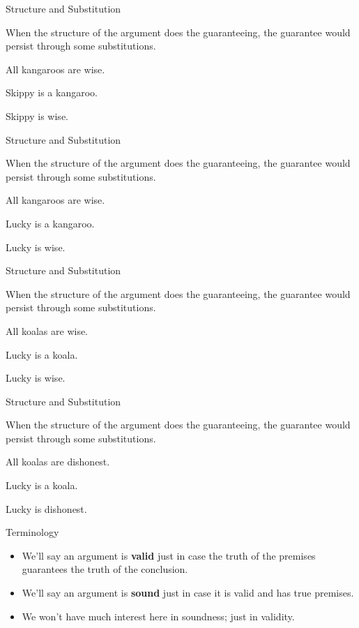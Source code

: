 \documentclass[ignorenonframetext,]{beamer}
\providecommand{\tightlist}{%
  \setlength{\itemsep}{0pt}\setlength{\parskip}{0pt}}
\renewcommand{\,}{\text{, }}
\renewenvironment*{quote}	
	{\list{}{\rightmargin   \leftmargin} \item } 	
	{\endlist }
\newcommand{\DisplayArg}[2]{
\begin{enumerate}
{#1}
\end{enumerate}
\vspace{-6pt}
\hrulefill

\begin{quote}
{\normalfont #2}
\end{quote}
\vspace{12pt}
}
\begin{document}
\begin{frame}{Structure and Substitution}
\protect\hypertarget{structure-and-substitution}{}

When the structure of the argument does the guaranteeing, the guarantee
would persist through some substitutions.

\DisplayArg{ \item All kangaroos are wise. \item Skippy is a kangaroo. } { Skippy is wise. }

\end{frame}

\begin{frame}{Structure and Substitution}
\protect\hypertarget{structure-and-substitution-1}{}

When the structure of the argument does the guaranteeing, the guarantee
would persist through some substitutions.

\DisplayArg{ \item All kangaroos are wise. \item Lucky is a kangaroo. } { Lucky is wise. }

\end{frame}

\begin{frame}{Structure and Substitution}
\protect\hypertarget{structure-and-substitution-2}{}

When the structure of the argument does the guaranteeing, the guarantee
would persist through some substitutions.

\DisplayArg{ \item All koalas are wise. \item Lucky is a koala. } { Lucky is wise. }

\end{frame}

\begin{frame}{Structure and Substitution}
\protect\hypertarget{structure-and-substitution-3}{}

When the structure of the argument does the guaranteeing, the guarantee
would persist through some substitutions.

\DisplayArg{ \item All koalas are dishonest. \item Lucky is a koala. } { Lucky is dishonest. }

\end{frame}

\begin{frame}{Terminology}
\protect\hypertarget{terminology}{}

\begin{itemize}
\tightlist
\item
  We'll say an argument is \textbf{valid} just in case the truth of the
  premises guarantees the truth of the conclusion.
\item
  We'll say an argument is \textbf{sound} just in case it is valid and
  has true premises.
\item
  We won't have much interest here in soundness; just in validity.
\end{itemize}

\end{frame}
\end{document}
